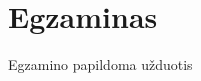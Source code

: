 \chapter{Egzaminas }
\hypertarget{md__r_e_a_d_m_e}{}\label{md__r_e_a_d_m_e}
\label{md__r_e_a_d_m_e_autotoc_md0}%
%


Egzamino papildoma užduotis 